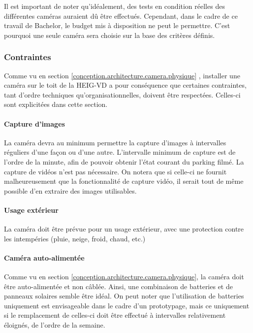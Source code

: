 Il est important de noter qu'idéalement, des tests en condition réelles des différentes caméras auraient dû être effectués. Cependant, dans le cadre de ce travail de Bachelor, le budget mis à disposition ne peut le permettre. C'est pourquoi une seule caméra sera choisie sur la base des critères définis.

\subsubsection{Contraintes}\label{conception.techno.camera.contraintes}
Comme vu en section \ref{conception.architecture.camera.physique} , installer une caméra sur le toit de la HEIG-VD a pour conséquence que certaines contraintes, tant d'ordre techniques qu'organisationnelles, doivent être respectées. Celles-ci sont explicitées dans cette section.

\paragraph{Capture d'images}
La caméra devra au minimum permettre la capture d'images à intervalles réguliers d'une façon ou d'une autre. L'intervalle minimum de capture est de l'ordre de la minute, afin de pouvoir obtenir l'état courant du parking filmé. La capture de vidéos n'est pas nécessaire. On notera que si celle-ci ne fournit malheureusement que la fonctionnalité de capture vidéo, il serait tout de même possible d'en extraire des images utilisables. 

\paragraph{Usage extérieur}
La caméra doit être prévue pour un usage extérieur, avec une protection contre les intempéries (pluie, neige, froid, chaud, etc.)

\paragraph{Caméra auto-alimentée}
Comme vu en section \ref{conception.architecture.camera.physique}, la caméra doit être auto-alimentée et non câblée. Ainsi, une combinaison de batteries et de panneaux solaires semble être idéal. On peut noter que l'utilisation de batteries uniquement est envisageable dans le cadre d'un prototypage, mais ce uniquement si le remplacement de celles-ci doit être effectué à intervalles relativement éloignés, de l'ordre de la semaine.

